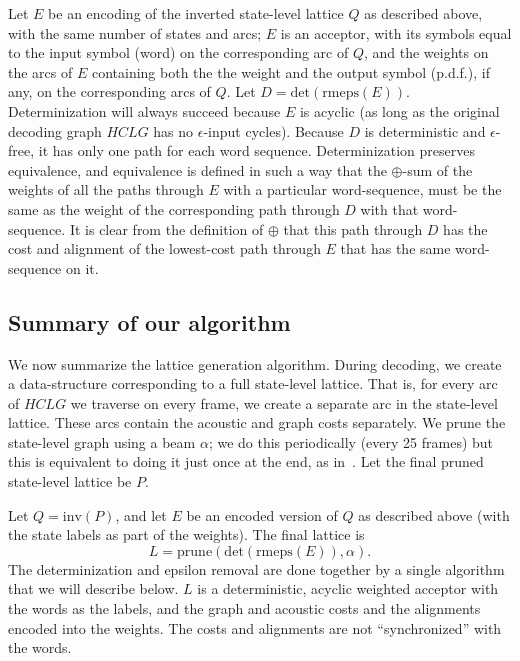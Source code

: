\documentclass{article}
\def\HCLG{{\mathit{HCLG}}}
\def\inv{{\mathrm{inv}}}
\begin{document}
Let $E$ be an encoding of the inverted state-level lattice $Q$ 
as described above, with the same number of states and arcs; $E$ is an acceptor, with its symbols
equal to the input symbol (word) on the corresponding arc of $Q$, and
the weights on the arcs of $E$ containing both the the weight and the output symbol (p.d.f.),
if any, on the corresponding arcs of $Q$.  Let $D = \mathrm{det}(\mathrm{rmeps}(E))$.
Determinization
will always succeed because $E$ is acyclic (as long as the original decoding
graph $\HCLG$ has no $\epsilon$-input cycles).  Because $D$ is deterministic
and $\epsilon$-free, it has only one path for each word sequence. 
Determinization preserves equivalence,
and equivalence is defined in such a way that the $\oplus$-sum of the
weights of all the paths through $E$ with a particular word-sequence, must be the same
as the weight of the corresponding path through $D$ with that word-sequence.
It is clear from the definition of $\oplus$ that this path through
$D$ has the cost and alignment of the lowest-cost path through $E$ that has the
same word-sequence on it.  

\subsection{Summary of our algorithm}

We now summarize the lattice generation algorithm.  During decoding, we create a data-structure
corresponding to a full state-level lattice.  That is, for every arc of $\HCLG$ we traverse
on every frame, we create a separate arc in the state-level lattice.  These arcs
contain the acoustic and graph costs separately.  We prune the state-level graph using
a beam $\alpha$; we do this periodically (every 25 frames) but this is equivalent to
doing it just once at the end, as in~\cite{efficient_general}.  Let the 
final pruned state-level lattice be $P$.

Let $Q = \inv(P)$, and let $E$ be an encoded version of $Q$ as described above (with the
state labels as part of the weights).  The final lattice is
\begin{equation}
   L = \mathrm{prune}(\mathrm{det}(\mathrm{rmeps}(E)), \alpha) .
\end{equation}
The determinization and epsilon removal are done together by a single algorithm
that we will describe below.  $L$ is a deterministic, acyclic weighted acceptor with the 
words as the labels, and the graph and acoustic costs and the alignments
encoded into the weights.  The costs and alignments are not ``synchronized'' 
with the words.
\end{document}
